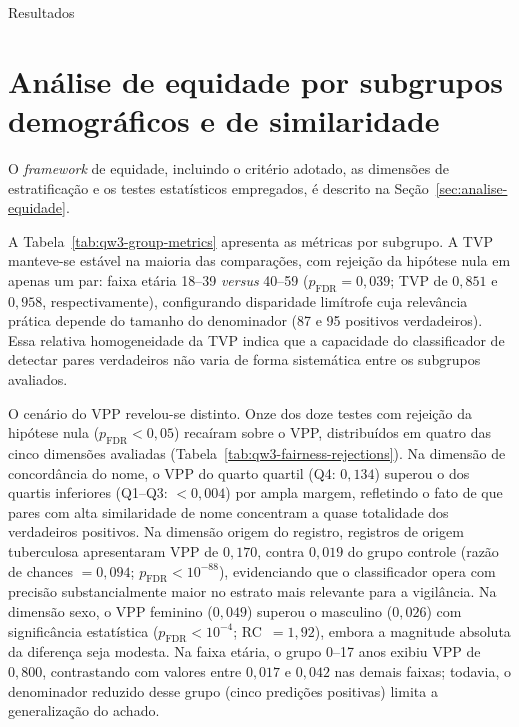 \begin{chapter}{Resultados}
\section{Análise de equidade por subgrupos demográficos e de similaridade}
\label{sec:cap5-qw3-fairness}

O \textit{framework} de equidade, incluindo o critério adotado, as dimensões de estratificação e os testes estatísticos empregados, é descrito na Seção~\ref{sec:analise-equidade}.



A Tabela~\ref{tab:qw3-group-metrics} apresenta as métricas por subgrupo.
A TVP manteve-se estável na maioria das comparações, com rejeição da hipótese nula em apenas um par: faixa etária 18--39 \textit{versus} 40--59 ($p_{\text{FDR}} = 0{,}039$; TVP de $0{,}851$ e $0{,}958$, respectivamente), configurando disparidade limítrofe cuja relevância prática depende do tamanho do denominador (87 e 95 positivos verdadeiros).
Essa relativa homogeneidade da TVP indica que a capacidade do classificador de detectar pares verdadeiros não varia de forma sistemática entre os subgrupos avaliados.

O cenário do VPP revelou-se distinto.
Onze dos doze testes com rejeição da hipótese nula ($p_{\text{FDR}} < 0{,}05$) recaíram sobre o VPP, distribuídos em quatro das cinco dimensões avaliadas (Tabela~\ref{tab:qw3-fairness-rejections}).
Na dimensão de concordância do nome, o VPP do quarto quartil (Q4: $0{,}134$) superou o dos quartis inferiores (Q1--Q3: $< 0{,}004$) por ampla margem, refletindo o fato de que pares com alta similaridade de nome concentram a quase totalidade dos verdadeiros positivos.
Na dimensão origem do registro, registros de origem tuberculosa apresentaram VPP de $0{,}170$, contra $0{,}019$ do grupo controle (razão de chances $= 0{,}094$; $p_{\text{FDR}} < 10^{-88}$), evidenciando que o classificador opera com precisão substancialmente maior no estrato mais relevante para a vigilância.
Na dimensão sexo, o VPP feminino ($0{,}049$) superou o masculino ($0{,}026$) com significância estatística ($p_{\text{FDR}} < 10^{-4}$; RC~$= 1{,}92$), embora a magnitude absoluta da diferença seja modesta.
Na faixa etária, o grupo 0--17 anos exibiu VPP de $0{,}800$, contrastando com valores entre $0{,}017$ e $0{,}042$ nas demais faixas; todavia, o denominador reduzido desse grupo (cinco predições positivas) limita a generalização do achado.




\end{chapter}
